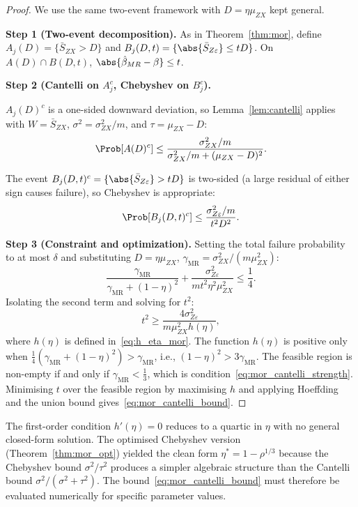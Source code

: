 \begin{proof}
    We use the same two-event framework with $D = \eta\mu_{ZX}$ kept general.

    \medskip\noindent\textbf{Step 1 (Two-event decomposition).}
    As in Theorem~\ref{thm:mor}, define $A_j(D) = \{\bar{S}_{ZX} > D\}$ and $B_j(D,t) = \{\abs{\bar{S}_{Z\varepsilon}}\leq tD\}$.
    On $A(D)\cap B(D,t)$, $\abs{\hat\beta_{MR}-\beta}\leq t$.

    \medskip\noindent\textbf{Step 2 (Cantelli on $A_j^c$, Chebyshev on $B_j^c$).}


    $A_j(D)^c$ is a one-sided downward deviation, so Lemma~\ref{lem:cantelli} applies with $W=\bar{S}_{ZX}$, $\sigma^2=\sigma_{ZX}^2/m$, and $\tau=\mu_{ZX}-D$:
    \[
        \Prob[A(D)^c]
        \leq
        \frac{\sigma_{ZX}^2/m}{\sigma_{ZX}^2/m +(\mu_{ZX} - D)^2}.
    \]

    The event $B_j(D,t)^c = \{\abs{\bar{S}_{Z\varepsilon}}>tD\}$ is two-sided (a large residual of either sign causes failure), so Chebyshev is appropriate:
    \[
        \Prob[B_j(D,t)^c] \leq \frac{\sigma_{Z\varepsilon}^2/m}{t^2 D^2}.
    \]

    \medskip\noindent\textbf{Step 3 (Constraint and optimization).}
    Setting the total failure probability to at most $\delta$ and substituting $D=\eta\mu_{ZX}$, $\gamma_{\mathrm{MR}}=\sigma_{ZX}^2/(m\mu_{ZX}^2)$:
    \[
        \frac{\gamma_{\mathrm{MR}}}{\gamma_{\mathrm{MR}}+(1-\eta)^2}
        + \frac{\sigma_{Z\varepsilon}^2}{m t^2\eta^2\mu_{ZX}^2}
        \leq \frac{1}{4}.
    \]
    Isolating the second term and solving for $t^2$:
    \[
        t^2 \geq \frac{4\sigma_{Z\varepsilon}^2}{m\mu_{ZX}^2h(\eta)},
    \]
    where $h(\eta)$ is defined in~\eqref{eq:h_eta_mor}. The function $h(\eta)$ is positive only when $\frac{1}{4}(\gamma_{\mathrm{MR}}+(1-\eta)^2)>\gamma_{\mathrm{MR}}$, i.e., $(1-\eta)^2 > 3\gamma_{\mathrm{MR}}$. The feasible region is non-empty if and only if $\gamma_{\mathrm{MR}} < \frac{1}{3}$, which is condition~\eqref{eq:mor_cantelli_strength}. Minimising $t$ over the feasible region by maximising $h$ and applying Hoeffding and the union bound gives~\eqref{eq:mor_cantelli_bound}.
\end{proof}

\begin{remark}
    \label{rem:cantelli_noform}
    The first-order condition $h'(\eta)=0$ reduces to a quartic in $\eta$ with no general closed-form solution. The optimised Chebyshev version (Theorem~\ref{thm:mor_opt}) yielded the clean form $\eta^*=1-\rho^{1/3}$ because the Chebyshev bound $\sigma^2/\tau^2$ produces a simpler algebraic structure than the Cantelli bound $\sigma^2/(\sigma^2+\tau^2)$. The bound~\eqref{eq:mor_cantelli_bound} must therefore be evaluated numerically for specific parameter values.
\end{remark}
